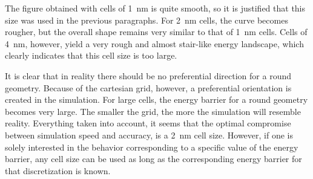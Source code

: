 \documentclass[12pt,a4paper]{article}
\begin{document}
The figure obtained with cells of \SI{1}{\nano\metre} is quite smooth, so it is justified that this size was used in the previous paragraphs. For \SI{2}{\nano\metre} cells, the curve becomes rougher, but the overall shape remains very similar to that of \SI{1}{\nano\metre} cells. Cells of \SI{4}{\nano\metre}, however, yield a very rough and almost stair-like energy landscape, which clearly indicates that this cell size is too large. \par
It is clear that in reality there should be no preferential direction for a round geometry. Because of the cartesian grid, however, a preferential orientation is created in the simulation. For large cells, the energy barrier for a round geometry becomes very large.
The smaller the grid, the more the simulation will resemble reality.
Everything taken into account, it seems that the optimal compromise between simulation speed and accuracy, is a \SI{2}{\nano\metre} cell size. However, if one is solely interested in the behavior corresponding to a specific value of the energy barrier, any cell size can be used as long as the corresponding energy barrier for that discretization is known.
\end{document}
